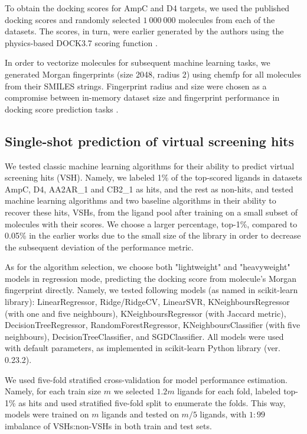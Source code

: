 To obtain the docking scores for AmpC and D4 targets, we used the published docking scores \cite{ultralarge_docking_first} and randomly selected $1\ 000\ 000$ molecules from each of the datasets. The scores, in turn, were earlier generated by the authors using the physics-based DOCK3.7 scoring function \cite{Coleman2013}.

In order to vectorize molecules for subsequent machine learning tasks, we generated Morgan fingerprints (size 2048, radius 2) using chemfp \cite{Dalke2019} for all molecules from their SMILES strings. Fingerprint radius and size were chosen as a compromise between in-memory dataset size and fingerprint performance in docking score prediction tasks \cite{logistic_regression}.


\subsection{Single-shot prediction of virtual screening hits}
We tested classic machine learning algorithms for their ability to predict virtual screening hits (VSH). Namely, we labeled 1\% of the top-scored ligands in datasets AmpC, D4, AA2AR\_1 and CB2\_1 as hits, and the rest as non-hits, and tested machine learning algorithms and two baseline algorithms in their ability to recover these hits, VSHs, from the ligand pool after training on a small subset of molecules with their scores. We choose a larger percentage, top-1\%, compared to 0.05\% in the earlier works  \cite{Graff2021AcceleratingLearning, logistic_regression, Yang2021_shoichet_active_learning} due to the small size of the library in order to decrease the subsequent deviation of the performance metric.

As for the algorithm selection, we choose both "lightweight" and "heavyweight" models in regression mode, predicting the docking score from molecule's Morgan fingerprint directly. Namely, we tested following models (as named in scikit-learn library): LinearRegressor, Ridge/RidgeCV, LinearSVR, KNeighboursRegressor (with one and five neighbours), KNeighboursRegressor (with Jaccard metric), DecisionTreeRegressor, RandomForestRegressor, KNeighboursClassifier (with five neighbours), DecisionTreeClassifier, and SGDClassifier. All models were used with default parameters, as implemented in scikit-learn Python library \cite{scikit-learn} (ver. 0.23.2).

We used five-fold stratified cross-validation for model performance estimation. Namely, for each train size $m$ we selected $1.2m$ ligands for each fold, labeled top-1\% as hits and used stratified five-fold split to enumerate the folds. This way, models were trained on $m$ ligands and tested on $m/5$ ligands, with $1:99$ imbalance of VSHs:non-VSHs in both train and test sets.

